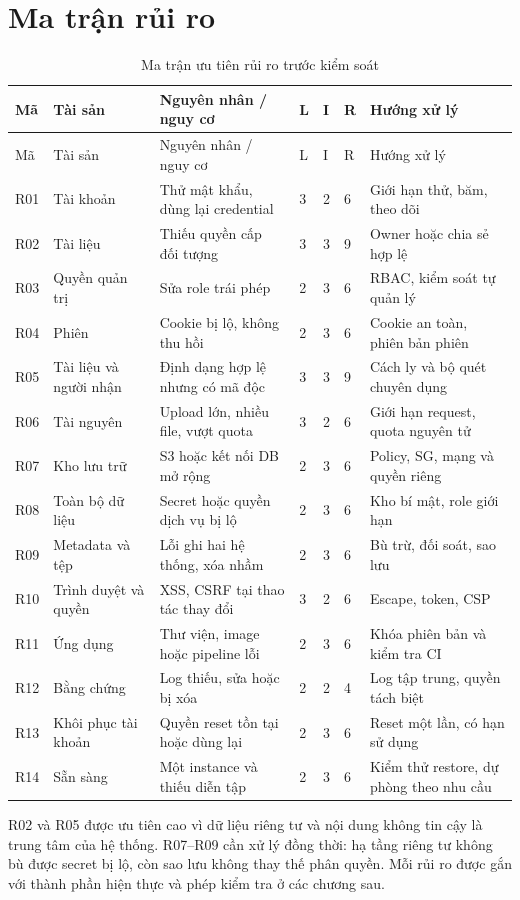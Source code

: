 \section{Ma trận rủi ro}
{\small
\begin{longtable}{P{.8cm}P{2.7cm}P{4.2cm}P{.5cm}P{.5cm}P{.5cm}P{3.5cm}}
\caption{Ma trận ưu tiên rủi ro trước kiểm soát}\label{tab:risk}\\
\toprule Mã & Tài sản & Nguyên nhân / nguy cơ & L & I & R & Hướng xử lý\\\midrule\endfirsthead
\toprule Mã & Tài sản & Nguyên nhân / nguy cơ & L & I & R & Hướng xử lý\\\midrule\endhead
R01 & Tài khoản & Thử mật khẩu, dùng lại credential & 3&2&6&Giới hạn thử, băm, theo dõi\\
R02 & Tài liệu & Thiếu quyền cấp đối tượng & 3&3&9&Owner hoặc chia sẻ hợp lệ\\
R03 & Quyền quản trị & Sửa role trái phép & 2&3&6&RBAC, kiểm soát tự quản lý\\
R04 & Phiên & Cookie bị lộ, không thu hồi & 2&3&6&Cookie an toàn, phiên bản phiên\\
R05 & Tài liệu và người nhận & Định dạng hợp lệ nhưng có mã độc & 3&3&9&Cách ly và bộ quét chuyên dụng\\
R06 & Tài nguyên & Upload lớn, nhiều file, vượt quota & 3&2&6&Giới hạn request, quota nguyên tử\\
R07 & Kho lưu trữ & S3 hoặc kết nối DB mở rộng & 2&3&6&Policy, SG, mạng và quyền riêng\\
R08 & Toàn bộ dữ liệu & Secret hoặc quyền dịch vụ bị lộ & 2&3&6&Kho bí mật, role giới hạn\\
R09 & Metadata và tệp & Lỗi ghi hai hệ thống, xóa nhầm & 2&3&6&Bù trừ, đối soát, sao lưu\\
R10 & Trình duyệt và quyền & XSS, CSRF tại thao tác thay đổi & 3&2&6&Escape, token, CSP\\
R11 & Ứng dụng & Thư viện, image hoặc pipeline lỗi & 2&3&6&Khóa phiên bản và kiểm tra CI\\
R12 & Bằng chứng & Log thiếu, sửa hoặc bị xóa & 2&2&4&Log tập trung, quyền tách biệt\\
R13 & Khôi phục tài khoản & Quyền reset tồn tại hoặc dùng lại & 2&3&6&Reset một lần, có hạn sử dụng\\
R14 & Sẵn sàng & Một instance và thiếu diễn tập & 2&3&6&Kiểm thử restore, dự phòng theo nhu cầu\\
\bottomrule
\end{longtable}}
R02 và R05 được ưu tiên cao vì dữ liệu riêng tư và nội dung không tin cậy là trung tâm của hệ thống. R07--R09 cần xử lý đồng thời: hạ tầng riêng tư không bù được secret bị lộ, còn sao lưu không thay thế phân quyền. Mỗi rủi ro được gắn với thành phần hiện thực và phép kiểm tra ở các chương sau.

